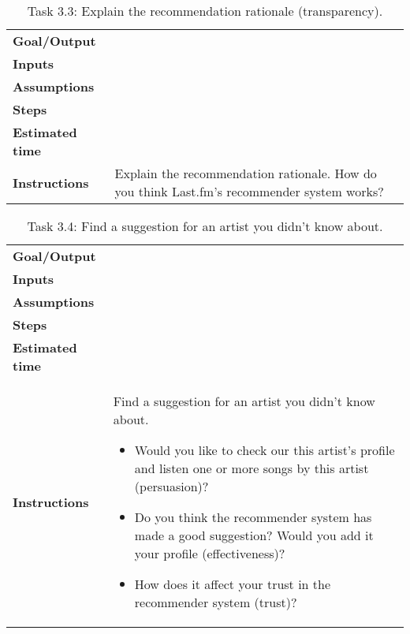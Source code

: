 \begin{table}
	\caption{Task 3.3: Explain the recommendation rationale (transparency).}
	\begin{tabular}{ p{80px} | p{350px} }
		\hline
		\textbf{Goal/Output}			& \\
		\textbf{Inputs}						& \\
		\textbf{Assumptions}			& \\
		\textbf{Steps}						& \\
		\textbf{Estimated time} 	& \\
		\textbf{Instructions}			&
		Explain the recommendation rationale. How do you think Last.fm's recommender system works?
		\\
		\hline
	\end{tabular}
	\label{table:task:t9}
\end{table}


\begin{table}
	\caption{Task 3.4: Find a suggestion for an artist you didn't know about.}
	\begin{tabular}{ p{80px} | p{350px} }
		\hline
		\textbf{Goal/Output}			& \\
		\textbf{Inputs}						& \\
		\textbf{Assumptions}			& \\
		\textbf{Steps}						& \\
		\textbf{Estimated time} 	& \\
		\textbf{Instructions}			&
		Find a suggestion for an artist you didn't know about.
		\begin{itemize}
			\item Would you like to check our this artist's profile and listen one or more songs by this artist (persuasion)?
			\item Do you think the recommender system has made a good suggestion? Would you add it your profile (effectiveness)?
			\item How does it affect your trust in the recommender system (trust)?
		\end{itemize}
		\\
		\hline
	\end{tabular}
	\label{table:task:t10}
\end{table}


